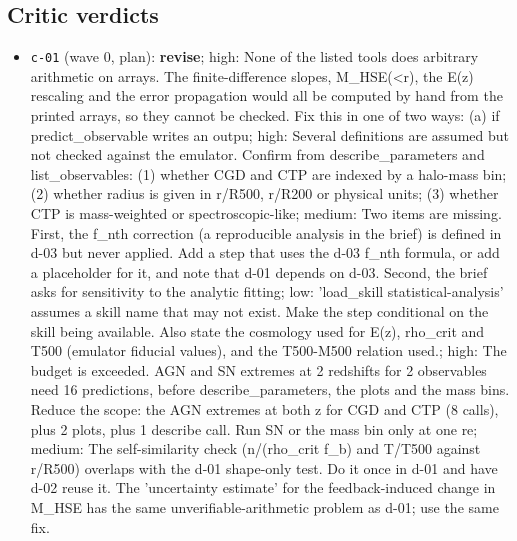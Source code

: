 \documentclass[11pt,a4paper]{article}
\begin{document}
\subsection{Critic verdicts}
\begin{itemize}
  \item \texttt{c-01} (wave 0, plan): \textbf{revise}; high: None of the listed tools does arbitrary arithmetic on arrays. The finite-difference slopes, M\_HSE(\textless{}r), the E(z) rescaling and the error propagation would all be computed by hand from the printed arrays, so they cannot be checked. Fix this in one of two ways: (a) if predict\_observable writes an outpu; high: Several definitions are assumed but not checked against the emulator. Confirm from describe\_parameters and list\_observables: (1) whether CGD and CTP are indexed by a halo-mass bin; (2) whether radius is given in r/R500, r/R200 or physical units; (3) whether CTP is mass-weighted or spectroscopic-like; medium: Two items are missing. First, the f\_nth correction (a reproducible analysis in the brief) is defined in d-03 but never applied. Add a step that uses the d-03 f\_nth formula, or add a placeholder for it, and note that d-01 depends on d-03. Second, the brief asks for sensitivity to the analytic fitting; low: 'load\_skill statistical-analysis' assumes a skill name that may not exist. Make the step conditional on the skill being available. Also state the cosmology used for E(z), rho\_crit and T500 (emulator fiducial values), and the T500-M500 relation used.; high: The budget is exceeded. AGN and SN extremes at 2 redshifts for 2 observables need 16 predictions, before describe\_parameters, the plots and the mass bins. Reduce the scope: the AGN extremes at both z for CGD and CTP (8 calls), plus 2 plots, plus 1 describe call. Run SN or the mass bin only at one re; medium: The self-similarity check (n/(rho\_crit f\_b) and T/T500 against r/R500) overlaps with the d-01 shape-only test. Do it once in d-01 and have d-02 reuse it. The 'uncertainty estimate' for the feedback-induced change in M\_HSE has the same unverifiable-arithmetic problem as d-01; use the same fix.

\end{itemize}
\end{document}
